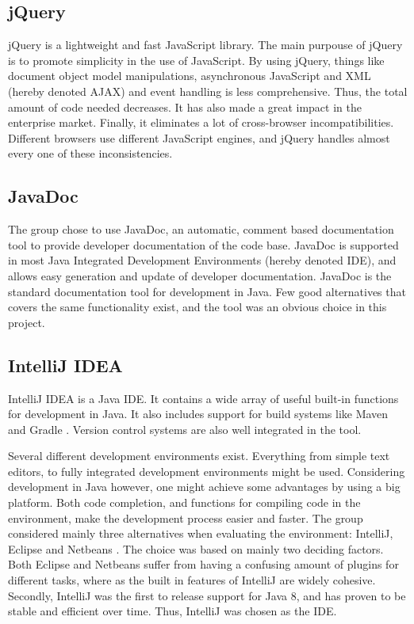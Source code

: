\subsection{jQuery}
\label{subsec:prestudies-tools-jQuery}

jQuery \cite{jquery} is a lightweight and fast JavaScript library. The main purpouse of jQuery is to promote simplicity in the use of JavaScript. By using jQuery, things like document object model manipulations,  asynchronous JavaScript and XML (hereby denoted AJAX) and event handling is less comprehensive. Thus, the total amount of code needed decreases. It has also made a great impact in the enterprise market. Finally, it eliminates a lot of cross-browser incompatibilities. Different browsers use different JavaScript engines, and jQuery handles almost every one of these inconsistencies.

\subsection{JavaDoc}
\label{subsec:prestudies-tools-javadoc}

The group chose to use JavaDoc, an automatic, comment based documentation tool to provide developer documentation of the code base. JavaDoc is supported in most Java Integrated Development Environments (hereby denoted IDE), and allows easy generation and update of developer documentation. JavaDoc is the standard documentation tool for development in Java. Few good alternatives that covers the same functionality exist, and the tool was an obvious choice in this project.

\subsection{IntelliJ IDEA}
\label{subsec:prestudies-tools-intellij_idea}

IntelliJ IDEA \cite{intellij-idea} is a Java IDE. It contains a wide array of useful built-in functions for development in Java. It also includes support for build systems like Maven \cite{maven} and Gradle \cite{gradle}. Version control systems are also well integrated in the tool.

Several different development environments exist. Everything from simple text editors, to fully integrated development environments might be used. Considering development in Java however, one might achieve some advantages by using a big platform. Both code completion, and functions for compiling code in the environment, make the development process easier and faster. The group considered mainly three alternatives when evaluating the environment: IntelliJ, Eclipse \cite{eclipse} and Netbeans \cite{netbeans}. The choice was based on mainly two deciding factors. Both Eclipse and Netbeans suffer from having a confusing amount of plugins for different tasks, where as the built in features of IntelliJ are widely cohesive. Secondly, IntelliJ was the first to release support for Java 8, and has proven to be stable and efficient over time. Thus, IntelliJ was chosen as the IDE.

